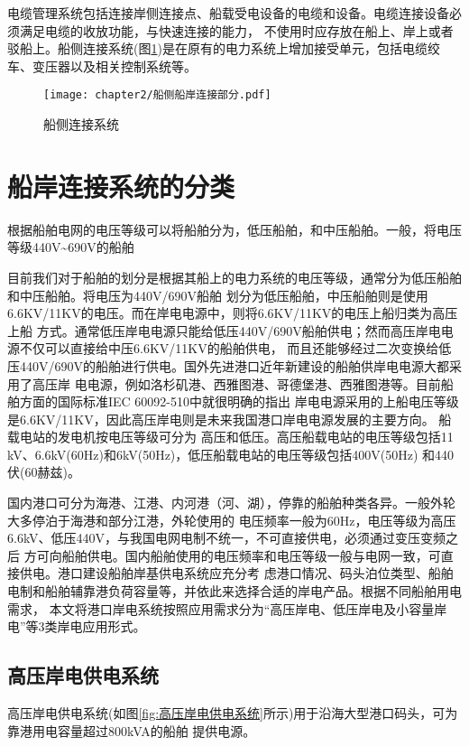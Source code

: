 电缆管理系统包括连接岸侧连接点、船载受电设备的电缆和设备。电缆连接设备必须满足电缆的收放功能，与快速连接的能力，
不使用时应存放在船上、岸上或者驳船上。船侧连接系统(图\ref{fig:船侧连接系统})是在原有的电力系统上增加接受单元，包括电缆绞车、变压器以及相关控制系统等。

\begin{figure}[!htp]
	\centering
	\texttt{[image: chapter2/船侧船岸连接部分.pdf]}
	\caption{船侧连接系统\cite{SP15}}
	\label{fig:船侧连接系统}
\end{figure}

\section{船岸连接系统的分类}

根据船舶电网的电压等级可以将船舶分为，低压船舶，和中压船舶。一般，将电压等级440V\~{}690V的船舶

目前我们对于船舶的划分是根据其船上的电力系统的电压等级，通常分为低压船舶和中压船舶。将电压为440V/690V船舶
划分为低压船舶，中压船舶则是使用6.6KV/11KV的电压。而在岸电电源中，则将6.6KV/11KV的电压上船归类为高压上船
方式。通常低压岸电电源只能给低压440V/690V船舶供电；然而高压岸电电源不仅可以直接给中压6.6KV/11KV的船舶供电，
而且还能够经过二次变换给低压440V/690V的船舶进行供电。国外先进港口近年新建设的船舶供岸电电源大都采用了高压岸
电电源，例如洛杉矶港、西雅图港、哥德堡港、西雅图港等。目前船舶方面的国际标准IEC 60092-510中就很明确的指出
岸电电源采用的上船电压等级是6.6KV/11KV，因此高压岸电则是未来我国港口岸电电源发展的主要方向。 
船载电站的发电机按电压等级可分为
高压和低压。高压船载电站的电压等级包括11 kV、6.6kV(60Hz)和6kV(50Hz)，低压船载电站的电压等级包括400V(50Hz)
和440伏(60赫兹)。

国内港口可分为海港、江港、内河港（河、湖），停靠的船舶种类各异。一般外轮大多停泊于海港和部分江港，外轮使用的
电压频率一般为60Hz，电压等级为高压6.6kV、低压440V，与我国电网电制不统一，不可直接供电，必须通过变压变频之后
方可向船舶供电。国内船舶使用的电压频率和电压等级一般与电网一致，可直接供电。港口建设船舶岸基供电系统应充分考
虑港口情况、码头泊位类型、船舶电制和船舶辅靠港负荷容量等，并依此来选择合适的岸电产品。根据不同船舶用电需求，
本文将港口岸电系统按照应用需求分为“高压岸电、低压岸电及小容量岸电”等3类岸电应用形式。

\subsection{高压岸电供电系统}

高压岸电供电系统(如图\ref{fig:高压岸电供电系统}所示)用于沿海大型港口码头，可为靠港用电容量超过800kVA的船舶
提供电源\cite{SP16}。

